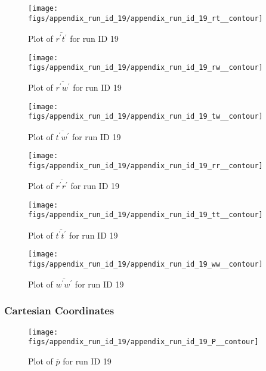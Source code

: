 \begin{figure}[H]
\centering
\texttt{[image: figs/appendix\_run\_id\_19/appendix\_run\_id\_19\_rt\_\_contour]}
\caption{Plot of $\overline{r^\prime t^\prime}$ for run ID 19}
\label{fig:appendix_run_id_19_rt__contour}
\end{figure}


\begin{figure}[H]
\centering
\texttt{[image: figs/appendix\_run\_id\_19/appendix\_run\_id\_19\_rw\_\_contour]}
\caption{Plot of $\overline{r^\prime w^\prime}$ for run ID 19}
\label{fig:appendix_run_id_19_rw__contour}
\end{figure}


\begin{figure}[H]
\centering
\texttt{[image: figs/appendix\_run\_id\_19/appendix\_run\_id\_19\_tw\_\_contour]}
\caption{Plot of $\overline{t^\prime w^\prime}$ for run ID 19}
\label{fig:appendix_run_id_19_tw__contour}
\end{figure}


\begin{figure}[H]
\centering
\texttt{[image: figs/appendix\_run\_id\_19/appendix\_run\_id\_19\_rr\_\_contour]}
\caption{Plot of $\overline{r^\prime r^\prime}$ for run ID 19}
\label{fig:appendix_run_id_19_rr__contour}
\end{figure}


\begin{figure}[H]
\centering
\texttt{[image: figs/appendix\_run\_id\_19/appendix\_run\_id\_19\_tt\_\_contour]}
\caption{Plot of $\overline{t^\prime t^\prime}$ for run ID 19}
\label{fig:appendix_run_id_19_tt__contour}
\end{figure}


\begin{figure}[H]
\centering
\texttt{[image: figs/appendix\_run\_id\_19/appendix\_run\_id\_19\_ww\_\_contour]}
\caption{Plot of $\overline{w^\prime w^\prime}$ for run ID 19}
\label{fig:appendix_run_id_19_ww__contour}
\end{figure}


\subsubsection{Cartesian Coordinates}
\begin{figure}[H]
\centering
\texttt{[image: figs/appendix\_run\_id\_19/appendix\_run\_id\_19\_P\_\_contour]}
\caption{Plot of $\overline{p}$ for run ID 19}
\label{fig:appendix_run_id_19_P__contour}
\end{figure}


